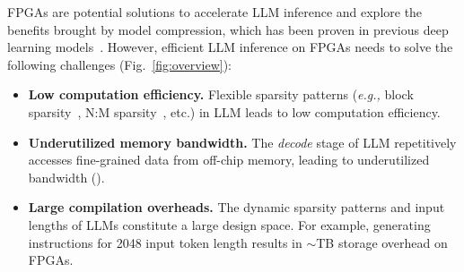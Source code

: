 FPGAs are potential solutions to accelerate LLM inference and explore the benefits brought by model compression, which has been proven in previous deep learning models~\cite{guo2017angel, wang2022logic, gong2022n3h, sun2022film, zhang2021fracbnn}. However, efficient LLM inference on FPGAs needs to solve the following challenges (Fig.~\ref{fig:overview}):
\begin{itemize}
    \item \textbf{Low computation efficiency.} Flexible sparsity patterns (\textit{e.g.,} block sparsity~\cite{zaheer2020bigbird}, N:M sparsity~\cite{chen2023dynamic_nm}, etc.) in LLM leads to low computation efficiency.
    \item \textbf{Underutilized memory bandwidth.} The \textit{decode} stage of LLM repetitively accesses fine-grained data from off-chip memory, leading to underutilized bandwidth (). 
    \item \textbf{Large compilation overheads.} The dynamic sparsity patterns and input lengths of LLMs constitute a large design space. For example, generating instructions for 2048 input token length results in $\sim$TB storage overhead on FPGAs.  
\end{itemize}

